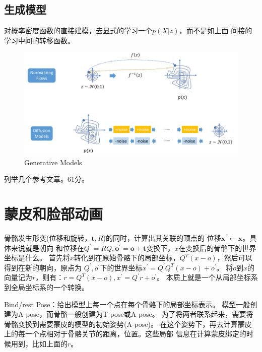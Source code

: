 \documentclass[lang=cn,newtx,10pt,scheme=chinese]{elegantbook}
\begin{document}
\subsection{生成模型}
对概率密度函数的直接建模，去显式的学习一个$p(X|z)$，而不是如上面
间接的学习中间的转移函数。
\begin{figure}[htbp]
  \centering
  \includegraphics[totalheight=2in]{"./image/GenerativeModels.png"}
  \caption{Generative Models} \label{fig:GenerativeModels}
\end{figure}

列举几个参考文章。61分。

\newpage
\section{蒙皮和脸部动画}
骨骼发生形变(位移和旋转，$\boldsymbol{t}, R$)的同时，计算出其关联的顶点的
位移$\boldsymbol{x^{\prime}} \leftarrow \boldsymbol{x}$。具体来说就是朝向
和位移在$Q^{\prime} = RQ, \boldsymbol{o^{\prime}} =
\boldsymbol{o} + \boldsymbol{t} $变换下，$x$在变换后的骨骼下的世界坐标是什么。
首先将$x$转化到在原始骨骼下的局部坐标，$Q^{T}(x-o)$，然后可以得到在新的朝向，原点为
$Q^{\prime}, o^{\prime}$下的世界坐标$x^{\prime}=Q^{\prime}Q^{T}(x-o) + o^{\prime}$。
将$o$到$x$的向量记为$r$，则有：$r=Q^{T}(x-o), x^{\prime} = Q^{\prime}r + o^{\prime}$。
本质上就是一个从局部坐标系到全局坐标系的一个转换。

Bind/rest Pose：给出模型上每一个点在每个骨骼下的局部坐标表示。
模型一般创建为A-pose，而骨骼一般创建为T-pose或A-pose。
为了将两者联系起来，需要将骨骼变换到需要蒙皮的模型的初始姿势(A-pose)。
在这个姿势下，再去计算蒙皮上的每一个点相对于骨骼关节的距离，位置。这些局部
信息在计算蒙皮绑定的时候用到，比如上面的$r$。
\end{document}
